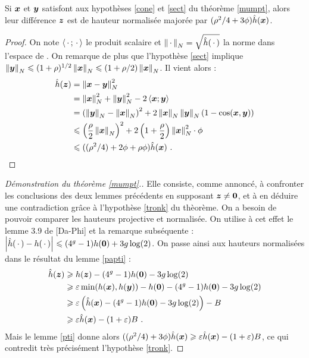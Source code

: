 \begin{lem} \label{pti}
Si $\p{x}$ et $\p{y}$ satisfont aux hypothèses \ref{cone} et \ref{sect} du théorème \ref{mumpt}, alors leur différence $\p{z}$ est de hauteur normalisée majorée par $(\rho^2/4 + 3\phi) \hn(\p{x})$.
\end{lem}

\begin{proof}
On note $\left<\truc; \truc \right>$ le produit scalaire et $\nv[N]{\truc} = \sqrt{\hn(\truc)}$ la norme dans l'espace de . On remarque de plus que l'hypothèse \ref{sect} implique $\nv[N]{\p{y}} \le (1+\rho)^{1/2}\nv[N]{\p{x}} \le (1+\rho/2) \nv[N]{\p{x}}$. Il vient alors :
\begin{align*}
\hn(\p{z}) & = \nv[N]{\p{x}-\p{y}}^2 \\ & = \nv[N]{\p{x}}^2 + \nv[N]{\p{y}}^2 - 2\left< \p{x}; \p{y} \right> \\
& = \left(\nv[N]{\p{y}} - \nv[N]{\p{x}}\right)^2 + 2\nv[N]{\p{x}}\nv[N]{\p{y}}\left( 1- \cos(\p{x}, \p{y}) \right) \\
& \le \left( \frac{\rho}{2}\nv[N]{\p{x}} \right)^2 + 2\left( 1+\frac{\rho}{2} \right) \nv[N]{\p{x}}^2 \cdot \phi \\
& \le ((\rho^2/4) + 2\phi + \rho\phi) \hn(\p{x})\pmm{.}\qedhere
\end{align*}
\end{proof}


\begin{proof}[Démonstration du théorème \ref{mumpt}.]
Elle consiste, comme annoncé, à confronter les conclusions des deux lemmes précédents en supposant $\p{z} \neq \OA$, et à en déduire une contradiction grâce à l'hypothèse \ref{tronk} du thèorème. On a besoin de pouvoir comparer les hauteurs projective et normalisée. On utilise à cet effet le lemme 3.9 de [Da-Phi] et la remarque subséquente : $\av[]{\hn(\truc) - h(\truc)} \le (4^g-1)h(\OA) + 3g\log(2)$. On passe ainsi aux hauteurs normalisées dans le résultat du lemme \ref{papti} :
\begin{align*}
\hn(\p{z}) & \ge h(\p{z}) - (4^g-1)h(\OA) - 3g\log(2)\\
& \ge \eps \min(h(\p{x}), h(\p{y})) - h(\OA) - (4^g-1)h(\OA) - 3g\log(2) \\
& \ge \eps \left(\hn(\p{x}) - (4^g-1)h(\OA) - 3g\log(2)\right) - B \\
& \ge \eps \hn(\p{x}) - (1+\eps)B \pmm{.}
\end{align*}
Mais le lemme \ref{pti} donne alors $((\rho^2/4) + 3\phi) \hn(\p{x}) \ge \eps \hn(\p{x}) - (1+\eps)B$, ce qui contredit très précisément l'hypothèse \ref{tronk}.
\end{proof}



